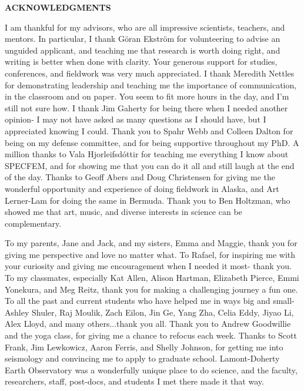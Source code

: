 \documentclass[12pt,oneside]{book}
\begin{document}
\begin{center}
{\bf ACKNOWLEDGMENTS }
\end{center}
{\fontsize{11}{14}
\selectfont
I am thankful for my advisors, who are all impressive scientists, teachers, and mentors. In particular, I thank G\"{o}ran Ekstr\"{o}m for volunteering to advise an unguided applicant, and teaching me that research is worth doing right, and writing is better when done with clarity. Your generous support for studies, conferences, and fieldwork was very much appreciated. I thank Meredith Nettles for demonstrating leadership and teaching me the importance of communication, in the classroom and on paper. You seem to fit more hours in the day, and I'm still not sure how. I thank Jim Gaherty for being there when I needed another opinion- I may not have asked as many questions as I should have, but I appreciated knowing I could. Thank you to Spahr Webb and Colleen Dalton for being on my defense committee, and for being supportive throughout my PhD. A million thanks to Vala Hjorleifsd\'{o}ttir for teaching me everything I know about SPECFEM, and for showing me that you can do it all and still laugh at the end of the day. Thanks to Geoff Abers and Doug Christensen for giving me the wonderful opportunity and experience of doing fieldwork in Alaska, and Art Lerner-Lam for doing the same in Bermuda. Thank you to Ben Holtzman, who showed me that art, music, and diverse interests in science can be complementary. 

To my parents, Jane and Jack, and my sisters, Emma and Maggie, thank you for giving me perspective and love no matter what. To Rafael, for inspiring me with your curiosity and giving me encouragement when I needed it most- thank you. To my classmates, especially Kat Allen, Alison Hartman, Elizabeth Pierce, Emmi Yonekura, and Meg Reitz, thank you for making a challenging journey a fun one. To all the past and current students who have helped me in ways big and small- Ashley Shuler, Raj Moulik, Zach Eilon, Jin Ge, Yang Zha, Celia Eddy, Jiyao Li, Alex Lloyd, and many others...thank you all. Thank you to Andrew Goodwillie and the yoga class, for giving me a chance to refocus each week. Thanks to Scott Frank, Jim Lewkowicz, Aaron Ferris, and Shelly Johnson, for getting me into seismology and convincing me to apply to graduate school. Lamont-Doherty Earth Observatory was a wonderfully unique place to do science, and the faculty, researchers, staff, post-docs, and students I met there made it that way. }
\end{document}
